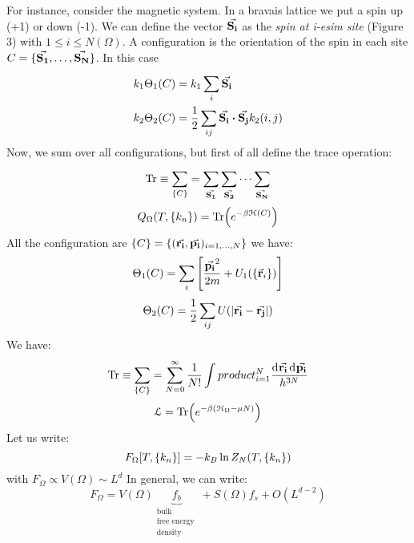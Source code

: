 \documentclass[../main/main.tex]{subfiles}
\begin{document}
For instance, consider the magnetic system. In a bravais lattice we put a spin up (+1) or down (-1). We can define the vector \( \va{S_i}  \) as the \emph{spin at i-esim site} (Figure 3) with \( 1 \le i \le N(\Omega ) \).
A configuration is the orientation of the spin in each site \( C = \{ \va{S_1},\dots,\va{S_N} \}  \).
In this case
\begin{subequations}
\begin{align}
  k_1 \Theta _1 (C) &= k_1 \sum_{i}^{} \va{S_i}  \\
  k_2  \Theta _2 (C) &= \frac{1}{2} \sum_{ij}^{} \va{S_i} \vdot \va{S_j} k_2 (i,j)
\end{align}
\label{}
\end{subequations}
Now, we sum over all configurations, but first of all define the trace operation:
\begin{equation}
  \Tr \equiv \sum_{\{C\}}^{} = \sum_{\va{S_1} }^{} \sum_{\va{S_2} }^{}  \dots \sum_{\va{S_N} }^{}
  \label{eq:}
\end{equation}
\begin{equation}
  Q_{\Omega } (T, \{k_n\}) = \Tr(e^{-\beta \mathcal{H}(C)} )
  \label{eq:}
\end{equation}
All the configuration are \( \{C\} = \{ (\va{r_i},\va{p_i}  )_{i=1,\dots,N}\} \)
we have:
\begin{equation}
  \Theta _1 (C) = \sum_{i}^{} \qty[\frac{\va{p_i}^2 }{2m}+ U_1 (\{\va{r}_i \})]
  \label{eq:}
\end{equation}
\begin{equation}
  \Theta _2 (C) = \frac{1}{2} \sum_{ij}^{} U ( \abs{\va{r_i} - \va{r_j}  } )
  \label{eq:}
\end{equation}
We have:
\begin{equation}
  \Tr \equiv \sum_{\{C\}}^{} = \sum_{N=0}^{\infty } \frac{1}{N!} \int_{}^{} product_{i=1}^{N} \frac{\dd[]{\va{r_i} \dd[]{\va{p_i} } } }{h^{3N}}
  \label{eq:}
\end{equation}
\begin{equation}
  \mathcal{L} = \Tr(e^{-\beta (\mathcal{H}_\Omega - \mu N)} )
  \label{eq:}
\end{equation}
Let us write:
\begin{equation}
 F_\Omega [T, \{k_n\}]= -k_B \ln{Z_N} (T,\qty{k_n} )
  \label{eq:}
\end{equation}
with \( F_\Omega \propto V(\Omega ) \sim L^d \)
In general, we can write:
\begin{equation}
  F_\Omega = V (\Omega ) \underbrace{f_b }_{\substack{ \text{bulk} \\  \text{free energy } \\ \text{density}} } + S (\Omega ) f_s + O (L^{d-2})
  \label{eq:}
\end{equation}
\end{document}
